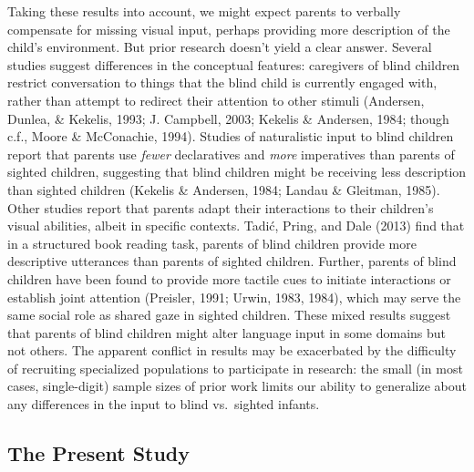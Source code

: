 \documentclass[
  man]{apa6}
\begin{document}
Taking these results into account, we might expect parents to verbally compensate for missing visual input, perhaps providing more description of the child's environment. But prior research doesn't yield a clear answer. Several studies suggest differences in the conceptual features: caregivers of blind children restrict conversation to things that the blind child is currently engaged with, rather than attempt to redirect their attention to other stimuli (Andersen, Dunlea, \& Kekelis, 1993; J. Campbell, 2003; Kekelis \& Andersen, 1984; though c.f., Moore \& McConachie, 1994). Studies of naturalistic input to blind children report that parents use \emph{fewer} declaratives and \emph{more} imperatives than parents of sighted children, suggesting that blind children might be receiving less description than sighted children (Kekelis \& Andersen, 1984; Landau \& Gleitman, 1985). Other studies report that parents adapt their interactions to their children's visual abilities, albeit in specific contexts. Tadić, Pring, and Dale (2013) find that in a structured book reading task, parents of blind children provide more descriptive utterances than parents of sighted children. Further, parents of blind children have been found to provide more tactile cues to initiate interactions or establish joint attention (Preisler, 1991; Urwin, 1983, 1984), which may serve the same social role as shared gaze in sighted children. These mixed results suggest that parents of blind children might alter language input in some domains but not others. The apparent conflict in results may be exacerbated by the difficulty of recruiting specialized populations to participate in research: the small (in most cases, single-digit) sample sizes of prior work limits our ability to generalize about any differences in the input to blind vs.~sighted infants.

\hypertarget{the-present-study}{%
\subsection{The Present Study}\label{the-present-study}}
\end{document}
